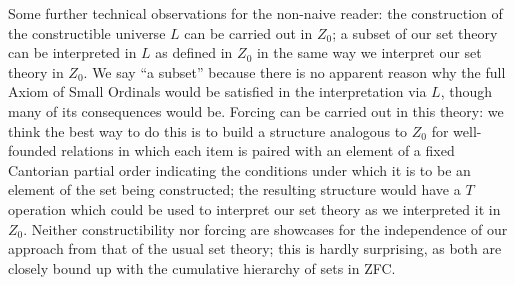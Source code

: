 Some further technical observations for the non-naive reader: the
construction of the constructible universe $L$ can be carried out in
$Z_0$; a subset of our set theory can be interpreted in $L$ as defined
in $Z_0$ in the same way we interpret our set theory in $Z_0$.  We say
``a subset'' because there is no apparent reason why the full Axiom of
Small Ordinals would be satisfied in the
interpretation via $L$, 
though many of its consequences would be.  Forcing can be carried out
in this theory: we think the best way to do this is to build a
structure analogous to $Z_0$ for well-founded relations in which each
item is paired with an element of a fixed Cantorian partial order 
indicating the conditions under which it is to be an element of the
set being constructed; the resulting structure would have a $T$
operation which could be used to interpret our set theory as we
interpreted it in $Z_0$.  Neither constructibility nor forcing are
showcases for the independence of our approach from that of the
usual 
set theory; this is hardly surprising, as both are closely bound up
with the cumulative hierarchy of sets in ZFC.
